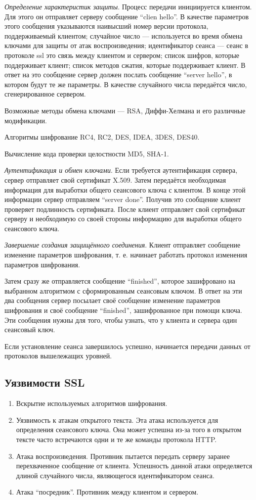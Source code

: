 \documentclass[12pt, russian, oneside, article]{ncc}
\begin{document}
\emph{Определение характеристик защиты}. Процесс передачи инициируется клиентом. Для этого он отправляет серверу сообщение ``clien hello''. В качестве параметров этого сообщения указываются наивысший номер версии протокола, поддерживаемый клиентом; случайное число --- используется во время обмена ключами для защиты от атак воспроизведения; идентификатор сеанса --- сеанс в протоколе ssl это связь между клиентом и сервером; список шифров, которые поддерживает клиент; список методов сжатия, которые поддерживает клиент. В ответ на это сообщение сервер должен послать сообщение ``server hello'', в котором будут те же параметры. В качестве случайного числа передаётся число, сгенерированное сервером.

Возможные методы обмена ключами --- RSA, Диффи-Хелмана и его различные модификации.

Алгоритмы шифрование RC4, RC2, DES, IDEA, 3DES, DES40.

Вычисление кода проверки целостности MD5, SHA-1.

\emph{Аутентификация и обмен ключами}. Если требуется аутентификация сервера, сервер отправляет свой сертификат X.509. Затем передаётся необходимая информация для выработки общего сеансового ключа с клиентом. В конце этой информации сервер отправляем ``server done''. Получив это сообщение клиент проверяет подлинность сертификата. После клиент отправляет свой сертификат серверу и необходимую со своей стороны информацию для выработки общего сеансового ключа.

\emph{Завершение создания защищённого соединения}. Клиент отправляет сообщение изменение параметров шифрования, т. е. начинает работать протокол изменения параметров шифрования.

Затем сразу же отправляется сообщение ``finished'', которое зашифровано на выбранном алгоритмом с сформированным сеансовым ключом. В ответ на эти два сообщения сервер посылает своё сообщение изменение параметров шифрования и своё сообщение ``finished'', зашифрованное при помощи ключа. Эти сообщения нужны для того, чтобы узнать, что у клиента и сервера один сеансовый ключ.

Если установление сеанса завершилось успешно, начинается передачи данных от протоколов вышележащих уровней.
\subsection{Уязвимости SSL}
\label{sec-7_2}


\begin{enumerate}
\item Вскрытие используемых алгоритмов шифрования.
\item Уязвимость к атакам открытого текста. Эта атака используется для определения сеансового ключа. Она может успешна из-за того в открытом тексте часто встречаются одни и те же команды протокола HTTP.
\item Атака воспроизведения. Противник пытается передать серверу заранее перехваченное сообщение от клиента. Успешность данной атаки определяется длиной случайного числа, являющегося идентификатором сеанса.
\item Атака ``посредник''. Противник между клиентом и сервером.
\end{enumerate}
\end{document}
